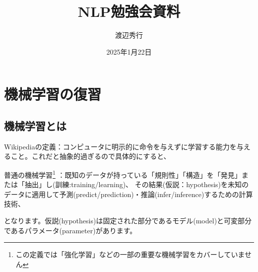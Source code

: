 \documentclass[a4j]{jarticle}
\title{NLP勉強会資料}
\date{2025年1月22日}
\author{渡辺秀行}
\begin{document}
\maketitle
\section{機械学習の復習}
\subsection{機械学習とは}
Wikipediaの定義：コンピュータに明示的に命令を与えずに学習する能力を与えること。これだと抽象的過ぎるので具体的にすると、

普通の機械学習\footnote{この定義では「強化学習」などの一部の重要な機械学習をカバーしていません}
：既知のデータが持っている「規則性」「構造」を「発見」または「抽出」し(訓練:training/learning)、
その結果(仮説：hypothesis)を未知のデータに適用して予測(predict/prediction)・推論(infer/inference)するための計算技術、

となります。仮説(hypothesis)は固定された部分であるモデル(model)と可変部分であるパラメータ(parameter)があります。
\end{document}
